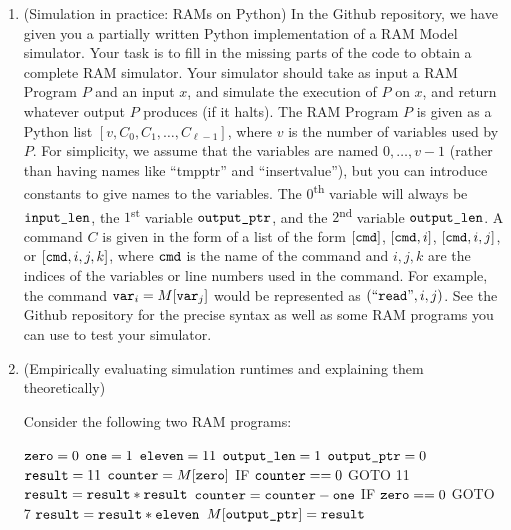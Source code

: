 \documentclass[11pt]{article}
\begin{document}
\begin{enumerate}
 
    \item (Simulation in practice: RAMs on Python)  
    In the Github repository, we have given you a partially written Python implementation of a RAM Model simulator.  Your task is to fill in the missing parts of the code to obtain a complete RAM simulator.
     Your simulator should take as input a RAM Program $P$ and an input $x$, and simulate the execution of $P$ on $x$, and return whatever output $P$ produces (if it halts).  The RAM Program $P$ is given as a Python list $[v,C_0,C_1,\ldots,C_{\ell-1}]$, where $v$ is the number of variables used by $P$.  For simplicity, we assume that the variables are named $0,\ldots,v-1$ (rather than having names like ``tmpptr'' and ``insertvalue''), but you can introduce constants to give names to the variables.  The $0$\textsuperscript{th} variable will always be $\texttt{input\_len}$, the $1$\textsuperscript{st} variable $\texttt{output\_ptr}$, and the $2$\textsuperscript{nd} variable $\texttt{output\_len}$.  A command $C$ is given in the form of a list of the form $[\texttt{cmd}]$, $[\texttt{cmd},i]$, $[\texttt{cmd},i,j]$, or $[\texttt{cmd},i,j,k]$, where $\texttt{cmd}$ is the name of the command and $i,j,k$ are the indices of the variables or line numbers used in the command.  For example,  the command $\texttt{var}_i = M[\texttt{var}_j]$ would be represented as $(``\texttt{read}",i,j)$.  See the Github repository for the precise syntax as well as some RAM programs you can use to test your simulator.

    \item (Empirically evaluating simulation runtimes and explaining them theoretically)  


Consider the following two RAM programs:

\begin{algorithm}[H]
\setcounter{AlgoLine}{-1}
$\texttt{zero} = 0$\;
$\texttt{one} = 1$\;
$\texttt{eleven} = 11$\;
$\texttt{output\_len} = 1$\;
$\texttt{output\_ptr} = 0$\;
$\texttt{result} = 11$\;
$\texttt{counter} = M[\texttt{zero}]$\;
\Indp
 IF $\texttt{counter} == 0$ GOTO 11\;
$\texttt{result} = \texttt{result} * \texttt{result}$\;
$\texttt{counter} = \texttt{counter} - \texttt{one}$\;
IF $\texttt{zero} == 0$ GOTO 7\;
\Indm
$\texttt{result} = \texttt{result} * \texttt{eleven}$\; \label{line:done}
$M[\texttt{output\_ptr}]=\texttt{result}$\;
\end{algorithm}



\end{enumerate}
\end{document}

